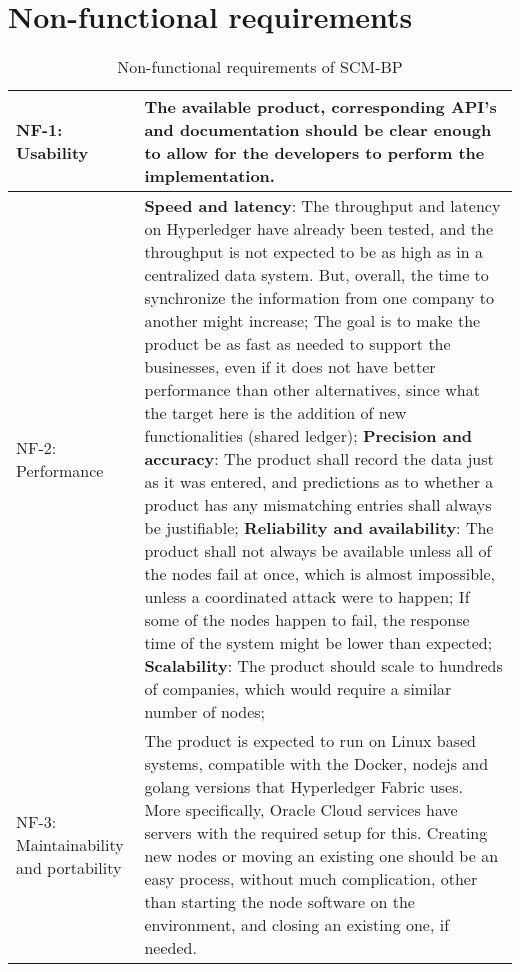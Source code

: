 \section{Non-functional requirements}{} %
\label{app:Non-functional}

\begin{table}[H]
\caption{Non-functional requirements of \ac{SCM-BP}}
\label{table:rnf}
\begin{tabular}{|p{3cm}|p{12cm}|}
\hline
NF-1: Usability & The available product, corresponding API's and documentation should be clear enough to allow for the developers to perform the implementation.\\
\hline
NF-2:  \newline Performance &  \textbf{Speed and latency}:  The throughput and latency on Hyperledger have already been tested, and the throughput is not expected to be as high as in a centralized data system. But, overall, the time to synchronize the information from one company to another might increase; The goal is to make the product be as fast as needed to support the businesses, even if it does not have better performance than other alternatives, since what the target here is the addition of new functionalities (shared ledger); \newline
\textbf{Precision and accuracy}: The product shall record the data just as it was entered, and predictions as to whether a product has any mismatching entries shall always be justifiable; \newline
\textbf{Reliability and availability}: The product shall not always be available unless all of the nodes fail at once, which is almost impossible, unless a coordinated attack were to happen; If some of the nodes happen to fail, the response time of the system might be lower than expected; \newline
\textbf{Scalability}: The product should scale to hundreds of companies, which would require a similar number of nodes;
\\
\hline
NF-3:  \newline Maintainability and portability & The product is expected to run on Linux based systems, compatible with the Docker, nodejs and golang versions that Hyperledger Fabric uses. More specifically, Oracle Cloud services have servers with the required setup for this. Creating new nodes or moving an existing one should be an easy process, without much complication, other than starting the node software on the environment, and closing an existing one, if needed. \\

\end{tabular}
\end{table}
